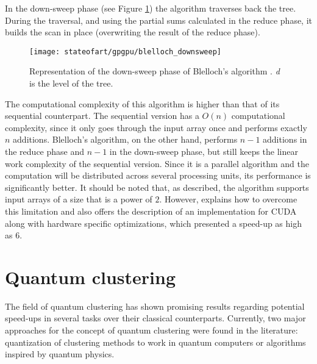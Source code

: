 In the down-sweep phase (see Figure \ref{fig:scan down-sweep}) the algorithm traverses back the tree.
During the traversal, and using the partial sums calculated in the reduce phase, it builds the scan in place (overwriting the result of the reduce phase).

\begin{figure}[hbtp]
\centering
\texttt{[image: stateofart/gpgpu/blelloch\_downsweep]}
\caption{Representation of the down-sweep phase of Blelloch's algorithm \cite{Harris2007}. \emph{d} is the level of the tree.}
\label{fig:scan down-sweep}
\end{figure}

The computational complexity of this algorithm is higher than that of its sequential counterpart.
The sequential version has a $O(n)$ computational complexity, since it only goes through the input array once and performs exactly $n$ additions.
Blelloch's algorithm, on the other hand, performs $n-1$ additions in the reduce phase and $n-1$  in the down-sweep phase, but still keeps the linear work complexity of the sequential version.
Since it is a parallel algorithm and the computation will be distributed across several processing units, its performance is significantly better.
It should be noted that, as described, the algorithm supports input arrays of a size that is a power of $2$.
However, \citet{Harris2007} explains how to overcome this limitation and also offers the description of an implementation for CUDA along with hardware specific optimizations, which presented a speed-up as high as 6.

%
%

\section{Quantum clustering}
\label{sec:quantum clustering}

The field of quantum clustering has shown promising results regarding potential speed-ups in several tasks over their classical counterparts. 
Currently, two major approaches for the concept of quantum clustering were found in the literature: quantization of clustering methods to work in quantum computers or algorithms inspired by quantum physics.


